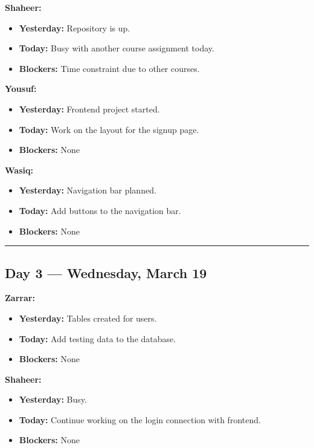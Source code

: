 \documentclass[12pt,a4paper]{article}
\begin{document}
\textbf{Shaheer:}
\begin{itemize}[noitemsep]
    \item \textbf{Yesterday:} Repository is up.
    \item \textbf{Today:} Busy with another course assignment today.
    \item \textbf{Blockers:} Time constraint due to other courses.
\end{itemize}

\textbf{Yousuf:}
\begin{itemize}[noitemsep]
    \item \textbf{Yesterday:} Frontend project started.
    \item \textbf{Today:} Work on the layout for the signup page.
    \item \textbf{Blockers:} None
\end{itemize}

\textbf{Wasiq:}
\begin{itemize}[noitemsep]
    \item \textbf{Yesterday:} Navigation bar planned.
    \item \textbf{Today:} Add buttons to the navigation bar.
    \item \textbf{Blockers:} None
\end{itemize}

\vspace{1em}
\hrule
\vspace{1em}

\subsection*{Day 3 --- Wednesday, March 19}

\textbf{Zarrar:}
\begin{itemize}[noitemsep]
    \item \textbf{Yesterday:} Tables created for users.
    \item \textbf{Today:} Add testing data to the database.
    \item \textbf{Blockers:} None
\end{itemize}

\textbf{Shaheer:}
\begin{itemize}[noitemsep]
    \item \textbf{Yesterday:} Busy.
    \item \textbf{Today:} Continue working on the login connection with frontend.
    \item \textbf{Blockers:} None
\end{itemize}
\end{document}
